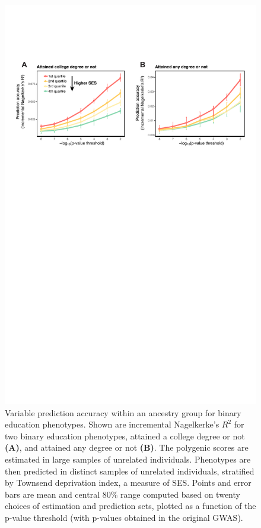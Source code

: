 \documentclass[hidelinks, 12pt]{article}
\begin{document}
\pagebreak

\begin{figure}[h]
\centering
\includegraphics[width=\textwidth]{./supp_figures/binary_edu_traits.pdf}
\caption[Variable prediction accuracy within an ancestry group for binary education phenotypes]{\small Variable prediction accuracy within an ancestry group for binary education phenotypes. Shown are incremental Nagelkerke's $R^2$ for two binary education phenotypes, attained a college degree or not {\bf (A)}, and attained any degree or not {\bf (B)}. The polygenic scores are estimated in large samples of unrelated individuals. Phenotypes are then predicted in distinct samples of unrelated individuals, stratified by Townsend deprivation index, a measure of SES. Points and error bars are mean and central 80\% range computed based on twenty choices of estimation and prediction sets, plotted as a function of the p-value threshold (with p-values obtained in the original GWAS).}
\end{figure}
\end{document}
